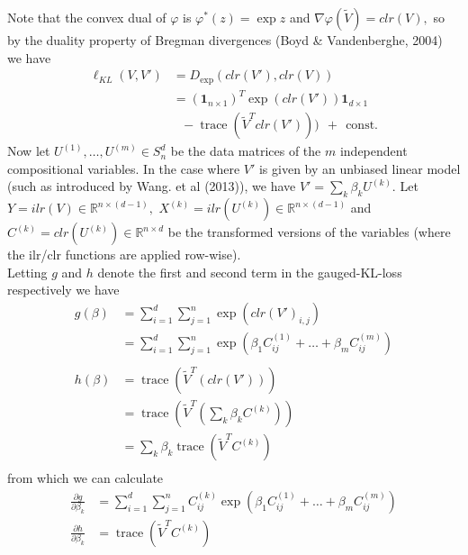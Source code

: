 \documentclass[BSc]{usydthesis}
\numberwithin{equation}{chapter}
\theoremstyle{remark}
\begin{document}
Note that the convex dual of $\varphi$ is $\varphi^*(z) = \exp z$ and $\nabla \varphi (\tilde{V}) = clr(V),$ so by the duality property of Bregman divergences (Boyd \& Vandenberghe, 2004) we have
\begin{align*}
 \ell_{KL} (V,V') &= D_{\exp} \left( clr(V'), clr(V) \right)\\
                  &= (\mathbf{1}_{n\times 1})^T \exp\left( clr(V')\right) \mathbf{1}_{d\times 1} \\
                  & \ \ \ - \operatorname{trace} \left( \tilde{V}^T clr(V') \right)) \ \ + \ \ \text{const.}
\end{align*}
Now let $U^{(1)}, \ldots, U^{(m)} \in S^d_n$ be the data matrices of the $m$ independent compositional variables. In the case where $V'$ is given by an unbiased linear model (such as introduced by Wang. et al (2013)), we have $V' = \sum_k \beta_k U^{(k)}.$ Let $Y = ilr(V) \in \mathbb{R}^{n \times (d-1)},$  $X^{(k)} = ilr (U^{(k)})\in \mathbb{R}^{n \times (d-1)}$ and $C^{(k)} = clr (U^{(k)})\in \mathbb{R}^{n \times d}$ be the transformed versions of the variables (where the ilr/clr functions are applied row-wise). \\

Letting $g$ and $h$ denote the first and second term in the gauged-KL-loss respectively we have 
\begin{align*}
 g(\beta) &= \sum_{i=1}^d \sum_{j=1}^n \exp \left( clr(V')_{i,j} \right)\\
         &= \sum_{i=1}^d \sum_{j=1}^n \exp \left( \beta_1 C^{(1)}_{ij} + \ldots + \beta_m C^{(m)}_{ij}
 \right)\\
 \ & \ \\
 h(\beta) &= \operatorname{trace}\left( \tilde{V}^T \left( clr(V') \right)  \right)\\
        &= \operatorname{trace}\left( \tilde{V}^T \left( \sum_k \beta_k C^{(k)} \right)  \right)\\
          &= \sum_k \beta_k \operatorname{trace}\left( \tilde{V}^T C^{(k)} \right)\\
\end{align*}
from which we can calculate
\begin{align*}
 \frac{ \partial g}{\partial \beta_k } &= \sum_{i=1}^d \sum_{j=1}^n C^{(k)}_{ij} \exp \left( \beta_1 C^{(1)}_{ij} + \ldots + \beta_m C^{(m)}_{ij} \right) \\
 \frac{ \partial h}{\partial \beta_k } &= \operatorname{trace}\left( \tilde{V}^T C^{(k)}\right)
\end{align*}
\end{document}
